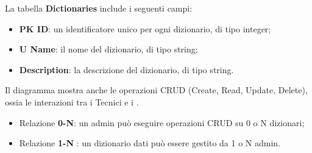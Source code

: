\par La tabella \textbf{Dictionaries} include i seguenti campi:
\begin{itemize}
    \item \textbf{PK ID}: un identificatore unico per ogni dizionario, di tipo integer;
    \item \textbf{U Name}: il nome del dizionario, di tipo string;
    \item \textbf{Description}: la descrizione del dizionario, di tipo string.
\end{itemize}

Il diagramma mostra anche le operazioni CRUD (Create, Read, Update, Delete), ossia le interazioni tra i Tecnici e i .

\begin{itemize}
      \item Relazione \textbf{0-N}: un admin può eseguire operazioni CRUD su 0 o N dizionari;
    \item Relazione \textbf{1-N} : un dizionario dati può essere gestito da 1 o N admin.
\end{itemize}